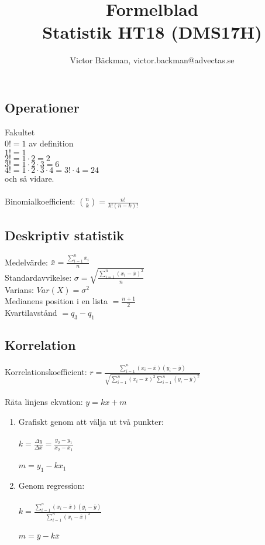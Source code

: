 \documentclass[a4paper,10pt]{article}
\title{Formelblad \\ {\large Statistik HT18 (DMS17H)}}
\author{Victor Bäckman, victor.backman@advectas.se}
\begin{document}
\maketitle

\subsection*{Operationer}
Fakultet\\
$0! = 1$ av definition \\
$1! = 1$ \\
$2! = 1 \cdot 2 = 2$ \\
$3! = 1 \cdot 2 \cdot 3 = 6$ \\
$4! = 1 \cdot 2 \cdot 3 \cdot 4 = 3! \cdot 4 = 24$ \\
och så vidare.\\
\vspace{1mm} \\
Binomialkoefficient: $\binom{n}{k} = \frac{n!}{k!(n-k)!}$

\subsection*{Deskriptiv statistik}
Medelvärde: $\bar{x} = \frac{\sum_{i=1}^n x_i}{n}$ \\
Standardavvikelse: $\sigma = \sqrt{\frac{\sum_{i=1}^n (x_i - \bar{x})^2}{n}}$ \\
Varians: $Var(X) = \sigma^2$ \\
Medianens position i en lista $= \frac{n+1}{2}$ \\
Kvartilavstånd $=q_3 -q_1$

\subsection*{Korrelation}
Korrelationskoefficient: $r=\frac{\sum_{i=1}^n (x_i - \bar{x})(y_i - \bar{y})}{\sqrt{\sum_{i=1}^n (x_i - \bar{x})^2\sum_{i=1}^n (y_i - \bar{y})^2}}$ \\
\, \\
Räta linjens ekvation: $y = kx + m$
\begin{enumerate}
  \item{Grafiskt genom att välja ut två punkter: \\ \, \\ $k=\frac{\Delta y}{\Delta x} = \frac{y_2 - y_1}{x_2 - x_1}$\\ \, \\ $m=y_1 - kx_1$}
  \item{Genom regression: \\ \, \\ $k=\frac{\sum_{i=1}^n (x_i - \bar{x})(y_i - \bar{y})}{\sum_{i=1}^n (x_i - \bar{x})^2}$ \\
\, \\
$m=\bar{y} - k\bar{x}$
  }
\end{enumerate}
\newpage
\end{document}
